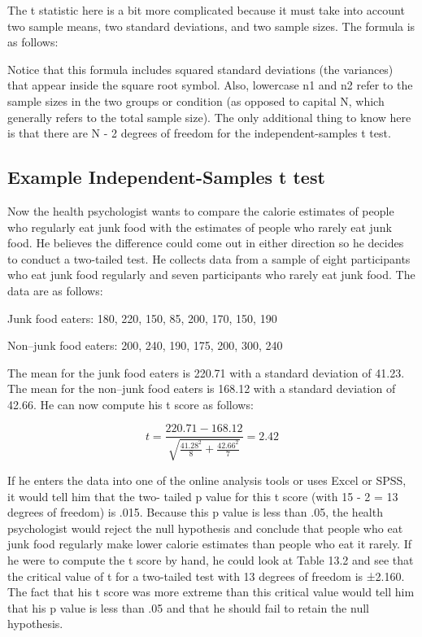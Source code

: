 The t statistic here is a bit more complicated because it must take into account two sample means, two standard deviations, and two sample sizes. The formula is as follows:



Notice that this formula includes squared standard deviations (the variances) that appear inside the square root symbol. Also, lowercase n1 and n2 refer to the sample sizes in the two groups or condition (as opposed to capital N, which generally refers to the total sample size). The only additional thing to know here is that there are N - 2 degrees of freedom for the independent-samples t test.


\subsection{Example Independent-Samples t test}

Now the health psychologist wants to compare the calorie estimates of people who regularly eat junk food with the estimates of people who rarely eat junk food. He believes the difference could come out in either direction so he decides to conduct a two-tailed test. He collects data from a sample of eight participants who eat junk food regularly and seven participants who rarely eat junk food. The data are as follows:


\begin{kframe}
Junk food eaters: 180, 220, 150, 85, 200, 170, 150, 190

\end{kframe}

\begin{kframe}
Non–junk food eaters: 200, 240, 190, 175, 200, 300, 240

\end{kframe}

The mean for the junk food eaters is 220.71 with a standard deviation of 41.23. The mean for the non–junk food eaters is 168.12 with a standard deviation of 42.66. He can now compute his t score as follows:


\begin{equation}
t = \frac{220.71-168.12}{ \sqrt{ \frac{41.28^2}{8} + \frac{42.66^2}{7} }} = 2.42
\end{equation}

If he enters the data into one of the online analysis tools or uses Excel or SPSS, it would tell him that the two- tailed p value for this t score (with 15 - 2 = 13 degrees of freedom) is .015. Because this p value is less than .05, the health psychologist would reject the null hypothesis and conclude that people who eat junk food regularly make lower calorie estimates than people who eat it rarely. If he were to compute the t score by hand, he could look at Table 13.2 and see that the critical value of t for a two-tailed test with 13 degrees of freedom is ±2.160. The fact that his t score was more extreme than this critical value would tell him that his p value is less than .05 and that he should fail to retain the null hypothesis.


